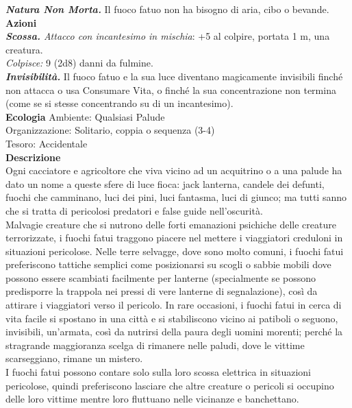 \begin{multicols}{2}
\emph{\textbf{Natura Non Morta.}} Il fuoco fatuo non ha bisogno di aria, cibo o bevande.\\
\smallskip\textbf{Azioni}\\
\emph{\textbf{Scossa.} Attacco con incantesimo in mischia}: +5 al colpire, portata 1 m, una creatura.\\
\emph{Colpisce:} 9 (2d8) danni da fulmine.\\
\emph{\textbf{Invisibilità.}} Il fuoco fatuo e la sua luce diventano magicamente invisibili finché non attacca o usa Consumare Vita, o finché la sua concentrazione non termina (come se si stesse concentrando su di un incantesimo).\\
\textbf{Ecologia}
Ambiente: Qualsiasi Palude\\
Organizzazione: Solitario, coppia o sequenza (3-4)\\
Tesoro: Accidentale\\
\textbf{Descrizione}\\
Ogni cacciatore e agricoltore che viva vicino ad un acquitrino o a una palude ha dato un nome a queste sfere di luce fioca: jack lanterna, candele dei defunti, fuochi che camminano, luci dei pini, luci fantasma, luci di giunco; ma tutti sanno che si tratta di pericolosi predatori e false guide nell'oscurità.\\

Malvagie creature che si nutrono delle forti emanazioni psichiche delle creature terrorizzate, i fuochi fatui traggono piacere nel mettere i viaggiatori creduloni in situazioni pericolose. Nelle terre selvagge, dove sono molto comuni, i fuochi fatui preferiscono tattiche semplici come posizionarsi su scogli o sabbie mobili dove possono essere scambiati facilmente per lanterne (specialmente se possono predisporre la trappola nei pressi di vere lanterne di segnalazione), così da attirare i viaggiatori verso il pericolo. In rare occasioni, i fuochi fatui in cerca di vita facile si spostano in una città e si stabiliscono vicino ai patiboli o seguono, invisibili, un'armata, così da nutrirsi della paura degli uomini morenti; perché la stragrande maggioranza scelga di rimanere nelle paludi, dove le vittime scarseggiano, rimane un mistero.\\

I fuochi fatui possono contare solo sulla loro scossa elettrica in situazioni pericolose, quindi preferiscono lasciare che altre creature o pericoli si occupino delle loro vittime mentre loro fluttuano nelle vicinanze e banchettano.\\


\end{multicols}
